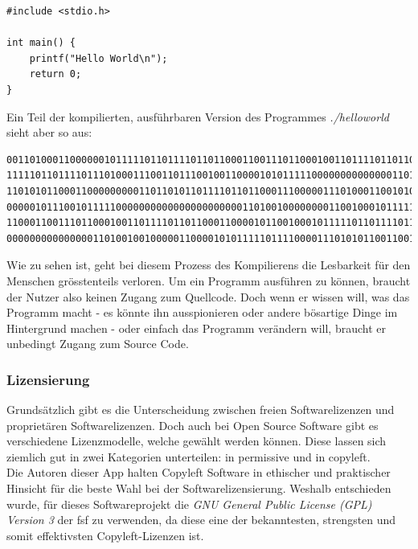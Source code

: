 \documentclass[a4paper,11pt]{article}
\begin{document}
\lstset{language=C}
\begin{lstlisting}
#include <stdio.h>

int main() {
    printf("Hello World\n");
    return 0;
}
\end{lstlisting}
Ein Teil der kompilierten, ausführbaren Version des Programmes \textit{./helloworld} sieht aber so aus:
\begin{lstlisting}
0011010001100000010111110110111101101100011001110110001001101111011011000110000101100100
1111101101111011101000111001101110010011000010101111100000000000000110100011100000111100
1101010110001100000000011011010110111101101100011100000111010001100101011001000110010100
0000010111001011111000000000000000000000011010010000000011001000101111101011111011011110
1100011001110110001001101111011011000110000101100100010111110110111101110100011100110111
0000000000000001101001001000001100001010111110111100001110101011001100101111101101110011
\end{lstlisting}

Wie zu sehen ist, geht bei diesem Prozess des Kompilierens die Lesbarkeit für den Menschen grösstenteils verloren. Um ein Programm ausführen zu können, braucht der Nutzer also keinen Zugang zum Quellcode. Doch wenn er wissen will, was das Programm macht - es könnte ihn ausspionieren oder andere bösartige Dinge im Hintergrund machen - oder einfach das Programm verändern will, braucht er unbedingt Zugang zum Source Code.\\

\newpage

\subsubsection{Lizensierung}
Grundsätzlich gibt es die  Unterscheidung zwischen freien Softwarelizenzen und proprietären Softwarelizenzen. Doch auch bei Open Source Software gibt es verschiedene Lizenzmodelle, welche gewählt werden können. Diese lassen sich ziemlich gut in zwei Kategorien unterteilen: in \gls{permissive} und in \gls{copyleft}.\\

Die Autoren dieser App halten Copyleft Software in ethischer und praktischer Hinsicht für die beste Wahl bei der Softwarelizensierung. Weshalb entschieden wurde, für dieses Softwareprojekt die \textit{GNU General Public License (GPL) Version 3} \cite{GPLv3} der \gls{fsf} zu verwenden, da diese eine der bekanntesten, strengsten und somit effektivsten Copyleft-Lizenzen ist.
\end{document}
